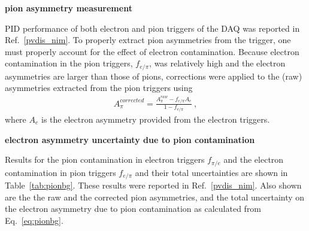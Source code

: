 \bigskip
\noindent
{\bf pion asymmetry measurement}

PID performance of both electron and pion triggers of the DAQ was reported in Ref.~\ref{pvdis_nim}. 
To properly extract pion asymmetries from the trigger, one must properly account for the effect
of electron contamination. Because electron contamination in the pion triggers, $f_{e/\pi}$, was
relatively high and the electron asymmetries are larger than those of pions, corrections were applied
to the (raw) asymmetries extracted from the pion triggers using
\begin{eqnarray}
  A_\pi^{corrected} = \frac{A_\pi^{raw}-f_{e/\pi}A_e}{1-f_{e/\pi}}~,
\end{eqnarray}
where $A_e$ is the electron asymmetry provided from the electron triggers. 

\bigskip
\noindent
{\bf electron asymmetry uncertainty due to pion contamination}

Results for the pion contamination in electron triggers $f_{\pi/e}$ and the electron contamination
in pion triggers $f_{e/\pi}$ and their total uncertainties are shown in Table~\ref{tab:pionbg}. 
These results were reported in Ref.~\ref{pvdis_nim}.
Also shown are the the raw and the corrected pion asymmetries, and the 
total uncertainty on the electron asymmetry due to pion contamination as calculated from Eq.~\ref{eq:pionbg}.

